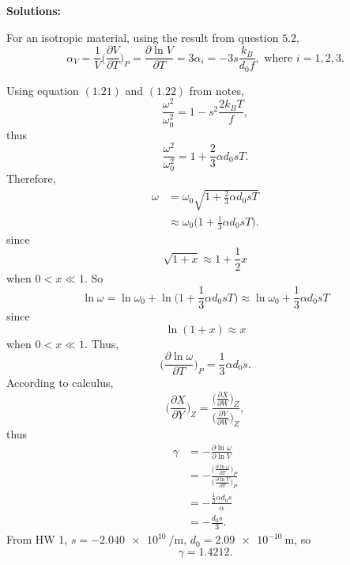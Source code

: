 \documentclass[12pt]{article}
\begin{document}
\textbf{Solutions:}

For an isotropic material, using the result from question $5.2$,
\begin{equation}
	\alpha_V = \frac{ 1 }{ V } \Big( \frac{\partial V}{\partial T} \Big)_P = \frac{\partial \ln V}{\partial T} = 3 \alpha_i = -3 s \frac{ k_B }{ d_0 f }, \text{ where } i = 1, 2, 3.
\end{equation}

Using equation $(1.21)$ and $(1.22)$ from notes,
\begin{equation}
	\frac{ \omega^2 }{ \omega_0^2 } = 1 - s^2 \frac{ 2 k_B T }{ f },
\end{equation}
thus
\begin{equation}
	\frac{ \omega^2 }{ \omega_0^2 } = 1 + \frac{ 2 }{ 3 } \alpha d_0 s T.
\end{equation}
Therefore,
\begin{equation}
	\begin{split}
		\omega &= \omega_0 \sqrt{1 + \frac{ 2 }{ 3 } \alpha d_0 s T} \\
		&\approx \omega_0 \bigg( 1 + \frac{ 1 }{ 3 } \alpha d_0 s T \bigg).
	\end{split}
\end{equation}
since
\begin{equation}
	\sqrt{1 + x} \approx 1 + \frac{1}{2} x
\end{equation}
when $0 < x \ll 1$.
So
\begin{equation}
	\ln \omega = \ln \omega_0 + \ln \bigg( 1 + \frac{ 1 }{ 3 } \alpha d_0 s T \bigg) \approx \ln \omega_0 + \frac{ 1 }{ 3 } \alpha d_0 s T
\end{equation}
since
\begin{equation}
	\ln (1 + x) \approx x
\end{equation}
when $0 < x \ll 1$.
Thus,
\begin{equation}
	\Big( \frac{ \partial \ln \omega }{ \partial T } \Big)_P = \frac{ 1 }{ 3 } \alpha d_0 s.
\end{equation}
According to calculus,
\begin{equation}
	\Big( \frac{ \partial X }{ \partial Y } \Big)_{ Z } = \frac{ \Big( \frac{ \partial X }{ \partial W } \Big)_{ Z } }{ \Big( \frac{ \partial Y }{ \partial W } \Big)_{ Z } },
\end{equation}
thus
\begin{equation}
	\begin{split}
		\gamma &= -\frac{ \partial \ln \omega }{ \partial \ln V } \\
		&= -\frac{ \Big( \frac{ \partial \ln \omega }{ \partial T } \Big)_P }{ \Big( \frac{ \partial \ln V }{ \partial T } \Big)_P } \\
		&= -\frac{ \frac{ 1 }{ 3 } \alpha d_0 s }{ \alpha } \\
		&= -\frac{ d_0 s }{ 3 }.
	\end{split}
\end{equation}
From HW 1, $s = \SI{-2.040e10}{\per\meter}$, $d_0 = \SI{2.09e-10}{\meter}$, so
\begin{equation}
	\gamma = 1.4212.
\end{equation}
\end{document}
